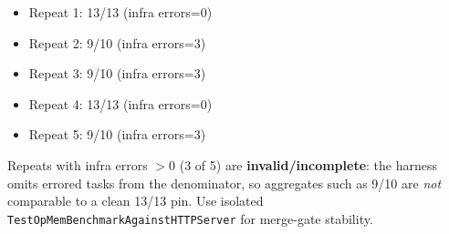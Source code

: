 \begin{itemize}
\item Repeat 1: 13/13 (infra errors=0)
\item Repeat 2: 9/10 (infra errors=3)
\item Repeat 3: 9/10 (infra errors=3)
\item Repeat 4: 13/13 (infra errors=0)
\item Repeat 5: 9/10 (infra errors=3)
\end{itemize}
Repeats with infra errors $>0$ (3 of 5) are \textbf{invalid/incomplete}: the harness omits errored tasks from the denominator, so aggregates such as 9/10 are \emph{not} comparable to a clean 13/13 pin.
Use isolated \texttt{TestOpMemBenchmarkAgainstHTTPServer} for merge-gate stability.
